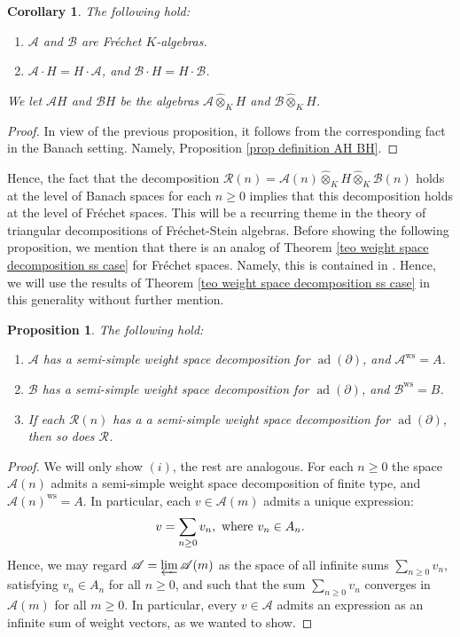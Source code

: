 \documentclass{amsart}
\newtheorem{prop}[defi]{ Proposition}
\newtheorem{coro}[defi]{Corollary}
\begin{document}
\begin{coro}
The following hold:
\begin{enumerate}[label=(\roman*)]
    \item $\mathscr{A}$ and $\mathscr{B}$ are Fréchet $K$-algebras.
    \item $\mathscr{A}\cdot H=H\cdot \mathscr{A}$, and $\mathscr{B}\cdot H=H\cdot \mathscr{B}$.
\end{enumerate}
We let $\mathscr{A}H$ and $\mathscr{B}H$ be the algebras $\mathscr{A}\widehat{\otimes}_KH$ and $\mathscr{B}\widehat{\otimes}_KH$.
\end{coro}
\begin{proof}
In view of the previous proposition, it follows from the corresponding fact in the Banach setting. Namely, Proposition \ref{prop definition AH BH}.
\end{proof}
Hence, the fact that the decomposition $\mathscr{R}(n)=\mathscr{A}(n)\widehat{\otimes}_KH\widehat{\otimes}_K\mathscr{B}(n)$ holds  at the level of Banach spaces for each $n\geq 0$ implies that this decomposition holds at the level of Fréchet spaces. This will be a recurring theme in the theory of triangular decompositions of Fréchet-Stein algebras. Before showing the following proposition, we mention that there is an analog of Theorem \ref{teo weight space decomposition ss case} for Fréchet spaces. Namely, this is contained in  \cite[Section 2]{Schmidt2010VermaMO}. Hence, we will use the results of Theorem \ref{teo weight space decomposition ss case} in this generality without further mention.
\begin{prop}\label{prop ws decompositions for graded subalgebras Frechet case}
The following hold:
\begin{enumerate}[label=(\roman*)]
    \item $\mathscr{A}$ has a semi-simple weight space decomposition for $\operatorname{ad}(\partial)$, and $\mathscr{A}^{\operatorname{ws}}=A$.
    \item $\mathscr{B}$ has a semi-simple weight space decomposition for $\operatorname{ad}(\partial)$, and $\mathscr{B}^{\operatorname{ws}}=B$.
    \item If each $\mathscr{R}(n)$ has a a semi-simple weight space decomposition for $\operatorname{ad}(\partial)$, then so does $\mathscr{R}$.
\end{enumerate}    
\end{prop}
\begin{proof}
We will only show $(i)$, the rest are analogous. For each $n\geq 0$ the space $\mathscr{A}(n)$ admits a semi-simple weight space decomposition of finite type, and $\mathscr{A}(n)^{\operatorname{ws}}=A$. In particular, each $v\in \mathscr{A}(m)$ admits a unique expression:
\begin{equation*}
    v=\sum_{n\geq 0}v_n, \textnormal{ where }v_n\in A_n.
\end{equation*}
Hence, we may regard $\mathscr{A}=\varprojlim\mathscr{A}(m)$ as the space of all infinite sums $\sum_{n\geq 0}v_n$, satisfying $v_n\in A_n$ for all $n\geq 0$, and such that the sum $\sum_{n\geq 0}v_n$ converges in $\mathscr{A}(m)$ for all $m\geq 0$. In particular, every $v\in \mathscr{A}$ admits an expression as an infinite sum of weight vectors, as we wanted to show.
\end{proof}
\end{document}
